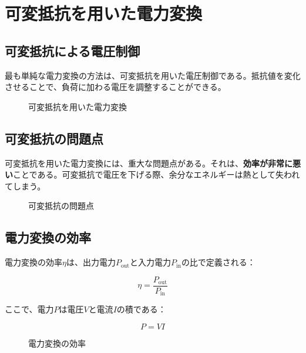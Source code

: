 \section{可変抵抗を用いた電力変換}

\subsection{可変抵抗による電圧制御}

最も単純な電力変換の方法は、可変抵抗を用いた電圧制御である。抵抗値を変化させることで、負荷に加わる電圧を調整することができる。

\begin{figure}[H]
\centering
{}
\caption{可変抵抗を用いた電力変換}
\label{fig:variable_resistor}
\end{figure}

\subsection{可変抵抗の問題点}

可変抵抗を用いた電力変換には、重大な問題点がある。それは、\textbf{効率が非常に悪い}ことである。可変抵抗で電圧を下げる際、余分なエネルギーは熱として失われてしまう。

\begin{figure}[H]
\centering
{}
\caption{可変抵抗の問題点}
\label{fig:resistor_problem}
\end{figure}

\subsection{電力変換の効率}

電力変換の効率$\eta$は、出力電力$P_{\text{out}}$と入力電力$P_{\text{in}}$の比で定義される：

\begin{equation}
\eta = \frac{P_{\text{out}}}{P_{\text{in}}}
\end{equation}

ここで、電力$P$は電圧$V$と電流$I$の積である：

\begin{equation}
P = VI
\end{equation}

\begin{figure}[H]
\centering
{}
\caption{電力変換の効率}
\label{fig:efficiency}
\end{figure}

